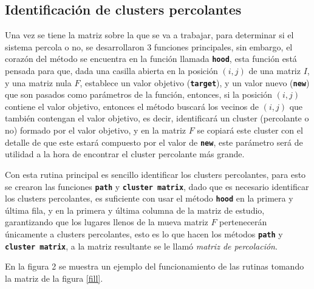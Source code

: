 \documentclass[11pt,twocolumn]{article}
\begin{document}
\subsection{\textbf{Identificación de clusters percolantes}}

Una vez se tiene la matriz sobre la que se va a trabajar, para determinar si el sistema percola o no, se desarrollaron 3 funciones principales, sin embargo, el corazón del método se encuentra en la función llamada \texttt{\textbf{hood}}, esta función está pensada para que, dada una casilla abierta en la posición $(i,j)$ de una matriz $I$, y una matriz nula $F$, establece un valor objetivo (\texttt{\textbf{target}}), y un valor nuevo (\texttt{\textbf{new}}) que son pasados como parámetros de la función, entonces, si la posición $(i,j)$ contiene el valor objetivo, entonces el método buscará los vecinos de $(i,j)$ que también contengan el valor objetivo, es decir, identificará un cluster (percolante o no) formado por el valor objetivo, y en la matriz $F$ se copiará este cluster con el detalle de que este estará compuesto por el valor de \texttt{\textbf{new}}, este parámetro será de utilidad a la hora de encontrar el cluster percolante más grande.
\vspace{0.2 cm}

Con esta rutina principal es sencillo identificar los clusters percolantes, para esto se crearon las funciones \texttt{\textbf{path}} y \texttt{\textbf{cluster matrix}}, dado que es necesario identificar los clusters percolantes, es suficiente con usar el método \texttt{\textbf{hood}} en la primera y última fila, y en la primera y última columna de la matriz de estudio, garantizando que los lugares llenos de la mueva matriz $F$ pertenecerán únicamente a clusters percolantes, esto es lo que hacen los métodos \texttt{\textbf{path}} y \texttt{\textbf{cluster matrix}}, a la matriz resultante se le llamó \textit{matriz de percolación}.
\vspace{0.2 cm}

En la figura 2 se muestra un ejemplo del funcionamiento de las rutinas tomando la matriz de la figura \ref{fill}.
\end{document}

